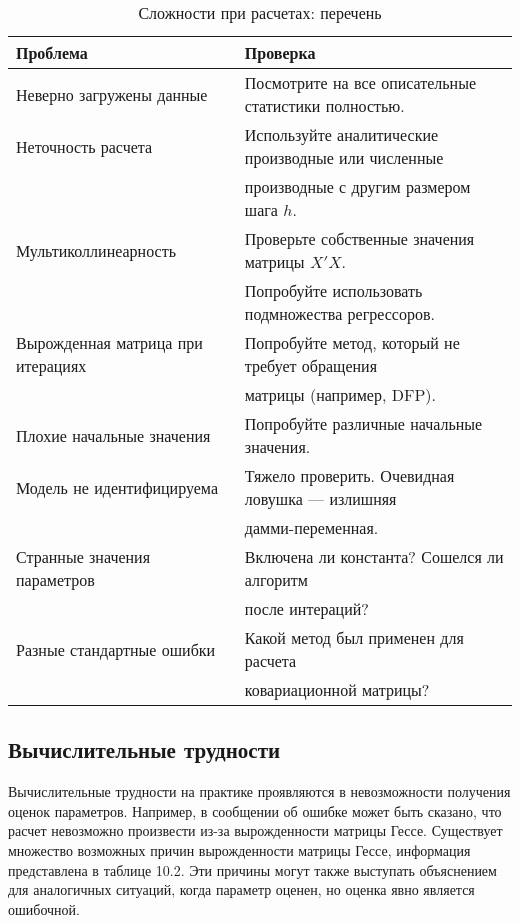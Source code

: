 \begin{table}[h]
\begin{center}
\caption{\label{tab:troubles} Сложности при расчетах: перечень}
\begin{tabular}{ll}
\hline 
\hline
Проблема & Проверка \\ 
\hline 
Неверно загружены данные & Посмотрите на все описательные статистики полностью. \\
Неточность расчета & Используйте аналитические производные или численные \\
& производные с другим размером шага $h$. \\
Мультиколлинеарность & Проверьте собственные значения матрицы $X'X$. \\
& Попробуйте использовать подмножества регрессоров. \\ 
Вырожденная матрица при итерациях & Попробуйте метод, который не требует обращения \\
& матрицы (например, DFP). \\
Плохие начальные значения & Попробуйте различные начальные значения. \\
Модель не идентифицируема & Тяжело проверить. Очевидная ловушка --- излишняя \\
& дамми-переменная. \\
Странные значения параметров & Включена ли константа? Сошелся ли алгоритм \\
& после интераций? \\
Разные стандартные ошибки & Какой метод был применен для расчета \\
& ковариационной матрицы? \\
\hline 
\hline
\end{tabular} 
\end{center}
\end{table}

\subsection{Вычислительные трудности}

Вычислительные трудности на практике проявляются в невозможности получения оценок параметров. Например, в сообщении об ошибке может быть сказано, что расчет невозможно произвести из-за вырожденности матрицы Гессе. Существует множество возможных причин вырожденности матрицы Гессе, информация представлена в таблице 10.2. Эти причины могут также выступать объяснением для аналогичных ситуаций, когда параметр оценен, но оценка явно является ошибочной. 


